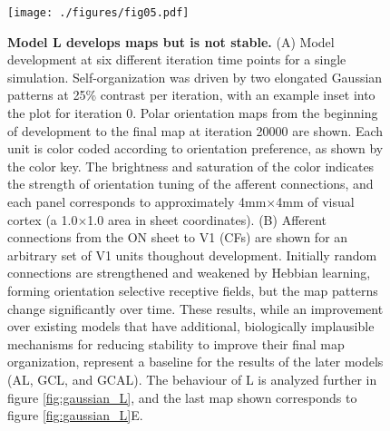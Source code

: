 \documentclass{article}
\def \scalefactor {0.666666}
\def \LdevelopmentScale {\scalefactor}     %
\begin{document}
\begin{figure}
\centerline{
\texttt{[image: ./figures/fig05.pdf]}
}
\caption[]{\textbf{Model L develops maps but is not stable.}  
          (A) Model development at six different
          iteration time points for a single simulation.
          Self-organization was driven by two elongated Gaussian
          patterns at 25\% contrast per iteration, with an example
          inset into the plot for iteration 0.  Polar orientation maps
          from the beginning of development to the final map at
          iteration 20000 are shown. Each unit is color coded
          according to orientation preference, as shown by the color
          key. The brightness and saturation of the color indicates
          the strength of orientation tuning of the afferent
          connections, and each panel corresponds to approximately
          4mm$\times$4mm of visual cortex (a 1.0$\times$1.0 area in
          sheet coordinates).  (B) Afferent connections 
          from the ON sheet to V1 (CFs) are shown for an arbitrary set
          of V1 units thoughout development. Initially random
          connections are strengthened and weakened by Hebbian
          learning, forming orientation selective receptive fields,
          but the map patterns change significantly over time.
          These results, while an improvement
          over existing models that have additional, biologically
          implausible mechanisms for reducing stability to improve
          their final map organization, represent a baseline for the
          results of the later models (AL, GCL, and GCAL). The
          behaviour of L is analyzed further in figure
          \ref{fig:gaussian_L}, and the last map shown corresponds to
          figure \ref{fig:gaussian_L}E.}
  \label{fig:L_development}
\end{figure}
\end{document}
